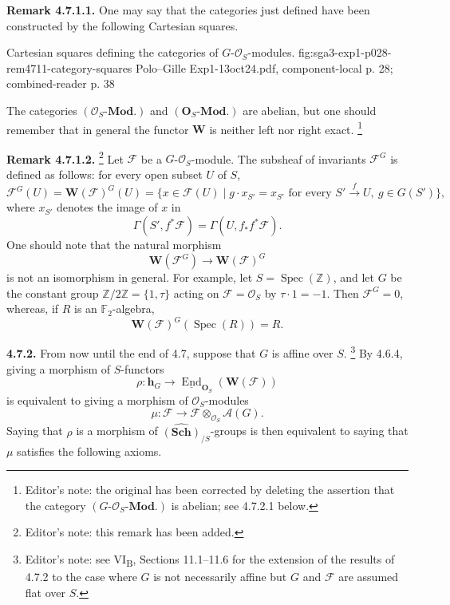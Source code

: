 \medskip
\noindent\textbf{Remark 4.7.1.1.}
One may say that the categories just defined have been constructed by
the following Cartesian squares.

  {Cartesian squares defining the categories of
  \(G\)-\(\mathcal O_S\)-modules.}
  {fig:sga3-exp1-p028-rem4711-category-squares}
  {Polo--Gille Exp1-13oct24.pdf, component-local p. 28; combined-reader p. 38}

The categories \((\mathcal O_S\text{-}\mathbf{Mod.})\) and
\((\mathbf O_S\text{-}\mathbf{Mod.})\) are abelian, but one should
remember that in general the functor \(\mathbf W\) is neither left nor
right exact.
\footnote{Editor's note: the original has been corrected by deleting the
assertion that the category
\((G\text{-}\mathcal O_S\text{-}\mathbf{Mod.})\) is abelian; see
4.7.2.1 below.}

\medskip
\noindent\textbf{Remark 4.7.1.2.}
\footnote{Editor's note: this remark has been added.}
Let \(\mathscr F\) be a \(G\)-\(\mathcal O_S\)-module. The subsheaf of
invariants \(\mathscr F^G\) is defined as follows: for every open subset
\(U\) of \(S\),
\[
  \mathscr F^G(U)=\mathbf W(\mathscr F)^G(U)
   =\bigl\{x\in\mathscr F(U)\mid
       g\cdot x_{S'}=x_{S'}
       \text{ for every }S'\xrightarrow{f}U,
       \ g\in G(S')\bigr\},
\]
where \(x_{S'}\) denotes the image of \(x\) in
\[
  \Gamma(S',f^*\mathscr F)=\Gamma(U,f_*f^*\mathscr F).
\]
One should note that the natural morphism
\[
  \mathbf W(\mathscr F^G)\longrightarrow\mathbf W(\mathscr F)^G
\]
is not an isomorphism in general. For example, let
\(S=\operatorname{Spec}(\mathbb Z)\), and let \(G\) be the constant
group \(\mathbb Z/2\mathbb Z=\{1,\tau\}\) acting on
\(\mathscr F=\mathcal O_S\) by \(\tau\cdot1=-1\). Then
\(\mathscr F^G=0\), whereas, if \(R\) is an \(\mathbb F_2\)-algebra,
\[
  \mathbf W(\mathscr F)^G(\operatorname{Spec}(R))=R.
\]

\medskip
\noindent\textbf{4.7.2.}
From now until the end of 4.7, suppose that \(G\) is affine over
\(S\).
\footnote{Editor's note: see VI\textsubscript{B}, Sections 11.1--11.6
for the extension of the results of 4.7.2 to the case where \(G\) is not
necessarily affine but \(G\) and \(\mathscr F\) are assumed flat over
\(S\).}
By 4.6.4, giving a morphism of \(S\)-functors
\[
  \rho:\mathbf h_G\longrightarrow
    \underline{\operatorname{End}}_{\mathbf O_S}
      (\mathbf W(\mathscr F))
\]
is equivalent to giving a morphism of \(\mathcal O_S\)-modules
\[
  \mu:\mathscr F\longrightarrow
    \mathscr F\otimes_{\mathcal O_S}\mathscr A(G).
\]
Saying that \(\rho\) is a morphism of
\(\widehat{(\mathbf{Sch})}_{/S}\)-groups is then equivalent to saying
that \(\mu\) satisfies the following axioms.

